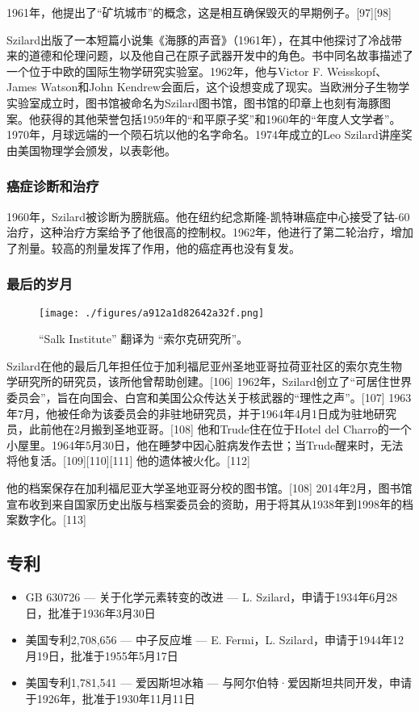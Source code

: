 1961年，他提出了“矿坑城市”的概念，这是相互确保毁灭的早期例子。[97][98]

Szilard出版了一本短篇小说集《海豚的声音》（1961年），在其中他探讨了冷战带来的道德和伦理问题，以及他自己在原子武器开发中的角色。书中同名故事描述了一个位于中欧的国际生物学研究实验室。1962年，他与Victor F. Weisskopf、James Watson和John Kendrew会面后，这个设想变成了现实。当欧洲分子生物学实验室成立时，图书馆被命名为Szilard图书馆，图书馆的印章上也刻有海豚图案。他获得的其他荣誉包括1959年的“和平原子奖”和1960年的“年度人文学者”。1970年，月球远端的一个陨石坑以他的名字命名。1974年成立的Leo Szilard讲座奖由美国物理学会颁发，以表彰他。
\subsubsection{癌症诊断和治疗}  
1960年，Szilard被诊断为膀胱癌。他在纽约纪念斯隆-凯特琳癌症中心接受了钴-60治疗，这种治疗方案给予了他很高的控制权。1962年，他进行了第二轮治疗，增加了剂量。较高的剂量发挥了作用，他的癌症再也没有复发。
\subsubsection{最后的岁月}
\begin{figure}[ht]
\centering
\texttt{[image: ./figures/a912a1d82642a32f.png]}
\caption{“Salk Institute” 翻译为 “索尔克研究所”。} \label{fig_Szilar_7}
\end{figure}
Szilard在他的最后几年担任位于加利福尼亚州圣地亚哥拉荷亚社区的索尔克生物学研究所的研究员，该所他曾帮助创建。[106] 1962年，Szilard创立了“可居住世界委员会”，旨在向国会、白宫和美国公众传达关于核武器的“理性之声”。[107] 1963年7月，他被任命为该委员会的非驻地研究员，并于1964年4月1日成为驻地研究员，此前他在2月搬到圣地亚哥。[108] 他和Trude住在位于Hotel del Charro的一个小屋里。1964年5月30日，他在睡梦中因心脏病发作去世；当Trude醒来时，无法将他复活。[109][110][111] 他的遗体被火化。[112]

他的档案保存在加利福尼亚大学圣地亚哥分校的图书馆。[108] 2014年2月，图书馆宣布收到来自国家历史出版与档案委员会的资助，用于将其从1938年到1998年的档案数字化。[113]
\subsection{专利}  
\begin{itemize}
\item GB 630726 — 关于化学元素转变的改进 — L. Szilard，申请于1934年6月28日，批准于1936年3月30日  
\item 美国专利2,708,656 — 中子反应堆 — E. Fermi，L. Szilard，申请于1944年12月19日，批准于1955年5月17日  
\item 美国专利1,781,541 — 爱因斯坦冰箱 — 与阿尔伯特·爱因斯坦共同开发，申请于1926年，批准于1930年11月11日
\end{itemize}
